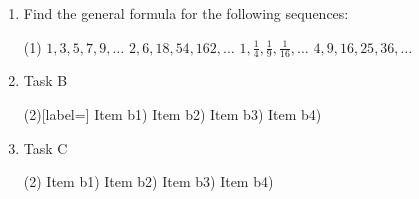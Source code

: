 \begin{exercises}
\end{exercises}
\begin{questions}
  \begin{multicols}{2}
    \begin{enumerate}[label = \alph*), wide, leftmargin = *, itemsep = 1ex, after = \setcounter{enumi}{0}]
      \item Find the general formula for the following sequences:
      \begin{tasks}[label=\roman*)](1)
        \task $1, 3, 5, 7, 9, \ldots$
        \task $2, 6, 18, 54, 162, \ldots$
        \task $1, \frac{1}{4}, \frac{1}{9}, \frac{1}{16}, \ldots$
        \task $4, 9, 16, 25, 36, \ldots$
      \end{tasks}
      \vfill\null
      \columnbreak
      \item Task B
      \begin{tasks}(2)[label=\roman*]
      \task Item b1)
      \task Item b2)
      \task Item b3)
      \task Item b4)
      \end{tasks}
          \item Task C \begin{tasks}(2)
      \task Item b1)
      \task Item b2)
      \task Item b3)
      \task Item b4)
      \end{tasks}
    \end{enumerate}
  \end{multicols}
\end{questions}